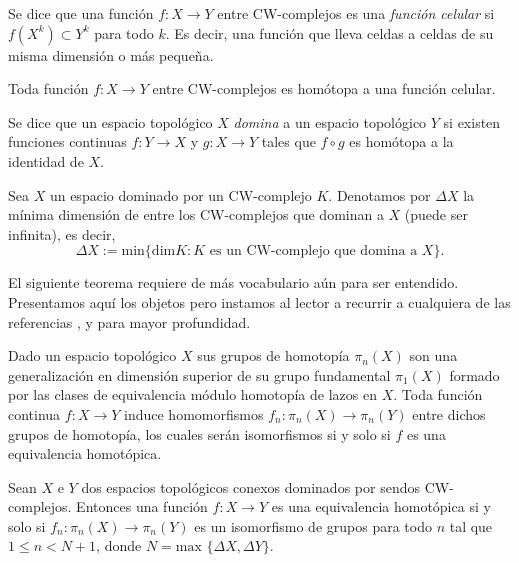 \begin{definition}
    Se dice que una función $f:X\to Y$ entre CW-complejos es una \textit{función celular} si $f(X^k)\subset Y^k$ para todo $k$. Es decir, una función que lleva celdas a celdas de su misma dimensión o más pequeña.
\end{definition}
\begin{theorem}
\label{aprox_celular}
    Toda función $f:X\to Y$ entre CW-complejos es homótopa a una función celular.
\end{theorem}

\bigskip

\begin{definition}
    Se dice que un espacio topológico $X$ \textit{domina} a un espacio topológico $Y$ si existen funciones continuas $f:Y\to X$ y $g:X\to Y$ tales que $f\circ g$ es homótopa a la identidad de $X$.
\end{definition}

\begin{definition}
    Sea $X$ un espacio dominado por un CW-complejo $K$. Denotamos por $\Delta X$ la mínima dimensión de entre los CW-complejos que dominan a $X$ (puede ser infinita), es decir,
    \begin{equation*}
        \Delta X := \text{min}\{\text{dim}K\colon K \text{ es un CW-complejo que domina a }X\}.
    \end{equation*}
\end{definition}

El siguiente teorema requiere de más vocabulario aún para ser entendido. Presentamos aquí los objetos pero instamos al lector a recurrir a cualquiera de las referencias \cite{Whitehead1949CombinatorialHomotopy}, \cite{munoz2021} y \cite{hatcher2002} para mayor profundidad.

Dado un espacio topológico $X$ sus grupos de homotopía $\pi_n(X)$ son una generalización en dimensión superior de su grupo fundamental $\pi_1(X)$ formado por las clases de equivalencia módulo homotopía de lazos en $X$. Toda función continua $f:X\to Y$ induce homomorfismos $f_n:\pi_n(X)\to \pi_n(Y)$ entre dichos grupos de homotopía, los cuales serán isomorfismos si y solo si $f$ es una equivalencia homotópica.

\begin{theorem}
\label{dominados}
    Sean $X$ e $Y$ dos espacios topológicos conexos dominados por sendos CW-complejos. Entonces una función $f:X\to Y$ es una equivalencia homotópica si y solo si $f_n:\pi_n(X)\to \pi_n(Y)$ es un isomorfismo de grupos para todo $n$ tal que $1\le n<N+1$, donde $N=\text{max } \{\Delta X,\Delta Y\}$.
\end{theorem}

